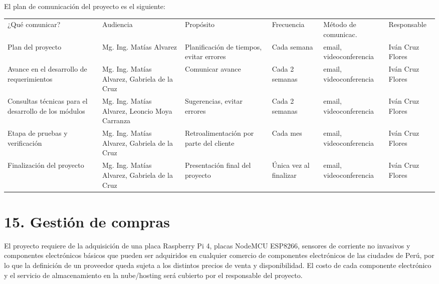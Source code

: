 \documentclass[11pt]{charter}
\begin{document}
El plan de comunicación del proyecto es el siguiente:

\begin{table}[htpb]
\centering
\begin{tabularx}{\linewidth}{@{}|X|C{2.7cm}|C{2.3cm}|C{1.8cm}|C{2cm}|C{2.1cm}|@{}}
\hline
{} 
           \\ \hline
{} 
¿Qué comunicar? & Audiencia & Propósito & Frecuencia & Método de comunicac. & Responsable \\ \hline
    Plan del proyecto              &   Mg. Ing. Matías Alvarez       &          Planificación de tiempos, evitar errores &   Cada semana        &     email, videoconferencia                  &    Iván Cruz  Flores    \\ \hline
   Avance en el desarrollo de requerimientos             &  Mg. Ing. Matías Alvarez, Gabriela de la Cruz         &    Comunicar avance       &     Cada 2 semanas       &                     email, videoconferencia &     Iván Cruz  Flores        \\ \hline
   Consultas técnicas para el desarrollo de los módulos             &          Mg. Ing. Matías Alvarez, Leoncio Moya Carranza &     Sugerencias, evitar errores      &     Cada 2 semanas       &                      email, videoconferencia &     Iván Cruz  Flores        \\ \hline
  Etapa de pruebas y verificación              &   Mg. Ing. Matías Alvarez, Gabriela de la Cruz        &    Retroalimentación por parte del cliente       &    Cada mes        &                     email, videoconferencia &       Iván Cruz  Flores      \\ \hline
  Finalización del proyecto              &   Mg. Ing. Matías Alvarez, Gabriela de la Cruz        &   Presentación final del proyecto        &    Única vez al finalizar        &                     email, videoconferencia &      Iván Cruz  Flores       \\ \hline
\end{tabularx}
\end{table}

\section{15. Gestión de compras}
\label{sec:compras}
El proyecto requiere de la adquisición de una placa Raspberry Pi 4, placas NodeMCU ESP8266, sensores de corriente no invasivos y componentes electrónicos básicos que pueden ser adquiridos en cualquier comercio de componentes electrónicos de las ciudades de Perú, por lo que la definición de un proveedor queda sujeta a los distintos precios de venta y disponibilidad. El costo de cada componente electrónico y el servicio de almacenamiento en la nube/hosting será cubierto por el responsable del proyecto.
\end{document}
